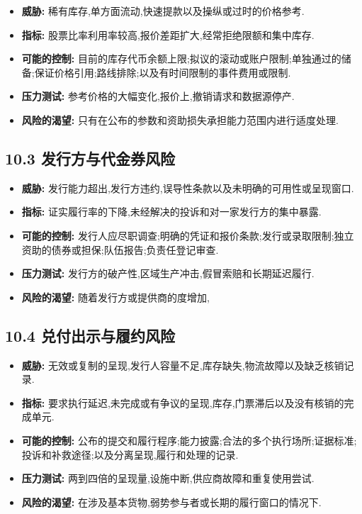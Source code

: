 \documentclass[11pt]{article}
\begin{document}
\begin{itemize}[leftmargin=*]
\item \textbf{威胁:} 稀有库存,单方面流动,快速提款以及操纵或过时的价格参考.
\item \textbf{指标:} 股票比率利用率较高,报价差距扩大,经常拒绝限额和集中库存.
\item \textbf{可能的控制:} 目前的库存代币余额上限;拟议的滚动或账户限制;单独通过的储备;保证价格引用;路线排除;以及有时间限制的事件费用或限制.
\item \textbf{压力测试:} 参考价格的大幅变化,报价上,撤销请求和数据源停产.
\item \textbf{风险的渴望:} 只有在公布的参数和资助损失承担能力范围内进行适度处理.
\end{itemize}
\subsection*{10.3 发行方与代金券风险}

\begin{itemize}[leftmargin=*]
\item \textbf{威胁:} 发行能力超出,发行方违约,误导性条款以及未明确的可用性或呈现窗口.
\item \textbf{指标:} 证实履行率的下降,未经解决的投诉和对一家发行方的集中暴露.
\item \textbf{可能的控制:} 发行人应尽职调查;明确的凭证和报价条款;发行或录取限制;独立资助的债券或担保;队伍报告;负责任登记审查.
\item \textbf{压力测试:} 发行方的破产性,区域生产冲击,假冒索赔和长期延迟履行.
\item \textbf{风险的渴望:} 随着发行方或提供商的度增加,
\end{itemize}
\subsection*{10.4 兑付出示与履约风险}

\begin{itemize}[leftmargin=*]
\item \textbf{威胁:} 无效或复制的呈现,发行人容量不足,库存缺失,物流故障以及缺乏核销记录.
\item \textbf{指标:} 要求执行延迟,未完成或有争议的呈现,库存,门票滞后以及没有核销的完成单元.
\item \textbf{可能的控制:} 公布的提交和履行程序;能力披露;合法的多个执行场所;证据标准;投诉和补救途径;以及分离呈现,履行和处理的记录.
\item \textbf{压力测试:} 两到四倍的呈现量,设施中断,供应商故障和重复使用尝试.
\item \textbf{风险的渴望:} 在涉及基本货物,弱势参与者或长期的履行窗口的情况下.
\end{itemize}
\end{document}
